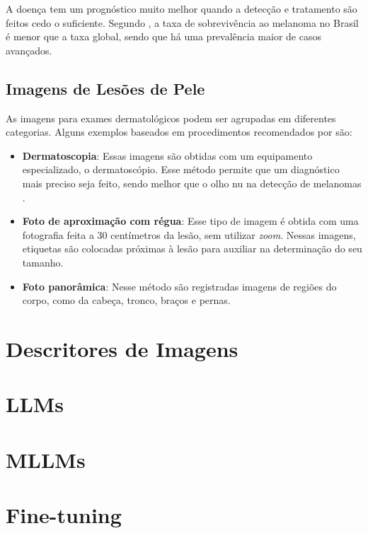 A doença tem um prognóstico muito melhor quando a detecção e tratamento são feitos cedo o suficiente. Segundo \cite{skin_cancer_survival}, a taxa de sobrevivência ao
melanoma no Brasil é menor que a taxa global, sendo que há uma prevalência maior de casos avançados.


\subsection{Imagens de Lesões de Pele}

As imagens para exames dermatológicos podem ser agrupadas em diferentes categorias. Alguns exemplos baseados em procedimentos recomendados por \cite{fotos_dermatologia}
são:

\begin{itemize}
    \item \textbf{Dermatoscopia}: Essas imagens são obtidas com um equipamento especializado, o dermatoscópio. Esse método permite que um diagnóstico mais preciso seja
feito, sendo melhor que o olho nu na detecção de melanomas \cite{dermatoscopy}.
    \item \textbf{Foto de aproximação com régua}: Esse tipo de imagem é obtida com uma fotografia feita a 30 centímetros da lesão, sem utilizar \textit{zoom}.
Nessas imagens, etiquetas são colocadas próximas à lesão para auxiliar na determinação do seu tamanho.
    \item \textbf{Foto panorâmica}: Nesse método são registradas imagens de regiões do corpo, como da cabeça, tronco, braços e pernas.
\end{itemize}



\section{Descritores de Imagens}

\section{LLMs}

\section{MLLMs}

\section{Fine-tuning}
